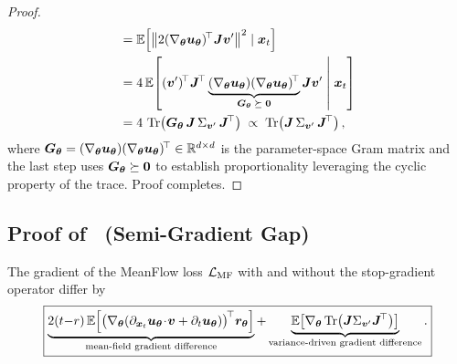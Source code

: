 \begin{appendices}
\begin{proof}
\begin{align}
            &=\E\!\left[\left\|2(\nabla_{\vtheta}\vu_{\vtheta})^{\!\top}\mJ\vv^{\prime}\right\|^{2}\mid\vx_{t}\right] \nonumber\\
            &=4\,\E\!\left[(\vv^{\prime})^{\!\top}\mJ^{\!\top}\underbrace{(\nabla_{\vtheta}\vu_{\vtheta})(\nabla_{\vtheta}\vu_{\vtheta})^{\!\top}}_{\mG_{\vtheta}\;\succeq\;\bm{0}}\mJ\vv^{\prime}\;\middle|\;\vx_{t}\right] \nonumber\\
            &=4\,\Tr\!\left(\mG_{\vtheta}\,\mJ\,\Sigma_{\vv^{\prime}}\,\mJ^{\!\top}\right)\;\propto\;\Tr\!\left(\mJ\,\Sigma_{\vv^{\prime}}\,\mJ^{\!\top}\right),
        \end{align}
        where ${\bm{G}}_{{\bm{\theta}}}=(\nabla_{{\bm{\theta}}}{\bm{u}}_{{\bm{\theta}}})(\nabla_{{\bm{\theta}}}{\bm{u}}_{{\bm{\theta}}})^{\!\top}\in\mathbb{R}^{d\times d}$ is the parameter-space Gram matrix and the last step uses ${\bm{G}}_{{\bm{\theta}}}\succeq\bm{0}$ to establish proportionality leveraging the cyclic property of the trace. Proof completes.
    \end{proof}

    \subsection{Proof of~ (Semi-Gradient Gap)}

    \begin{theorem}
        The gradient of the MeanFlow loss ${\mathcal{L}}_{\text{MF}}$ with and without the stop-gradient operator differ by
        \begin{equation*}
            \boxed{
                \underbrace{2(t{-}r)\,\E\!\left[\bigl(\nabla_{\vtheta}\!\left(\partial_{\vx_{t}}\vu_{\vtheta}\!\cdot\!\vv+\partial_{t}\vu_{\vtheta}\right)\bigr)^{\!\top}\vr_{\vtheta}\right]}_{\text{mean-field gradient difference}}
                +\underbrace{\E\!\left[\nabla_{\vtheta}\Tr\!\left(\mJ\Sigma_{\vv^{\prime}}\mJ^{\!\top}\right)\right]}_{\text{variance-driven gradient difference}}.
            }
        \end{equation*}
    \end{theorem}


\end{appendices}
